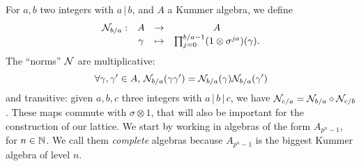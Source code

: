 \documentclass{sig-alternate}
\begin{document}
For $a, b$ two integers with $a\,|\,b$, and $A$ a Kummer
algebra, we define
\[
\begin{array}{cccc}
  \mathcal{N}_{b/a}: & A & \to & A \\
  & \gamma & \mapsto & \prod_{j=0}^{b/a-1} (1 \otimes
  \sigma^{ja})(\gamma).
\end{array}
\]
The ``norms'' $\mathcal{N}$ are multiplicative:
\[
  \forall\gamma, \gamma'\in A,\,\mathcal{N}_{b/a}(\gamma\gamma')=\mathcal{N}_{b/a}(\gamma)\mathcal{N}_{b/a}(\gamma')
\]
and transitive: given $a, b, c$ three integers with
$a\,|\,b\,|\,c$, we have $\mathcal{N}_{c/a} = \mathcal{N}_{b/a}\circ\mathcal{N}_{c/b}$. These maps 
commute with $\sigma\otimes1$, that will also be important for the construction
of our lattice. We start by working in algebras of the form $A_{p^n-1}$, for
$n\in\mathbb{N}$. We call them \emph{complete} algebras because
$A_{p^n-1}$ is the biggest Kummer algebra of level $n$.
\end{document}
